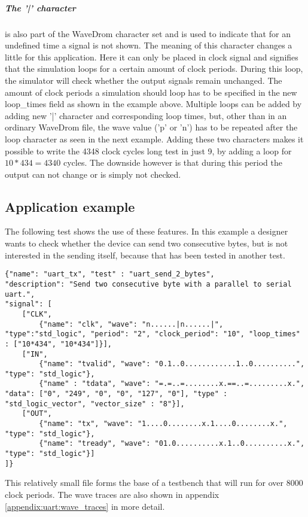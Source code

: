 \subparagraph{The '|' character} is also part of the WaveDrom character set and is used to indicate that for an undefined time a signal is not shown. The meaning of this character changes a little for this application. Here it can only be placed in clock signal and signifies that the simulation loops for a certain amount of clock periods. During this loop, the simulator will check whether the output signals remain unchanged. The amount of clock periods a simulation should loop has to be specified in the new loop\_times field as shown in the example above. Multiple loops can be added by adding new '|' character and corresponding loop times, but, other than in an ordinary WaveDrom file, the wave value ('p' or 'n') has to be repeated after the loop character as seen in the next example.
\npar
Adding these two characters makes it possible to write the 4348 clock cycles long test in just 9, by adding a loop for $10*434 = 4340$ cycles. The downside however is that during this period the output can not change or is simply not checked.
\newpage
\subsection{Application example}
The following test shows the use of these features. In this example a designer wants to check whether the device can send two consecutive bytes, but is not interested in the sending itself, because that has been tested in another test.
\begin{lstlisting}[style=json, caption={Source file for creating third transmission test for the UART design in \ref{appendix:uart}}, label={json:uart_2_bytes}]
{"name": "uart_tx", "test" : "uart_send_2_bytes", 
"description": "Send two consecutive byte with a parallel to serial uart.", 
"signal": [
	["CLK",
		{"name": "clk", "wave": "n......|n......|", "type":"std_logic", "period": "2", "clock_period": "10", "loop_times" : ["10*434", "10*434"]}],
	["IN",
		{"name": "tvalid", "wave": "0.1..0............1..0..........", "type": "std_logic"},
		{"name" : "tdata", "wave": "=.=..=........x.==..=.........x.", "data": ["0", "249", "0", "0", "127", "0"], "type" : "std_logic_vector", "vector_size" : "8"}],
	["OUT",
		{"name": "tx", "wave": "1....0........x.1....0........x.", "type": "std_logic"},
		{"name": "tready", "wave": "01.0..........x.1..0..........x.", "type": "std_logic"}]
]}
\end{lstlisting}\nline
{}\nline
This relatively small file forms the base of a testbench that will run for over 8000 clock periods. The wave traces are also shown in appendix \ref{appendix:uart:wave_traces} in more detail.

